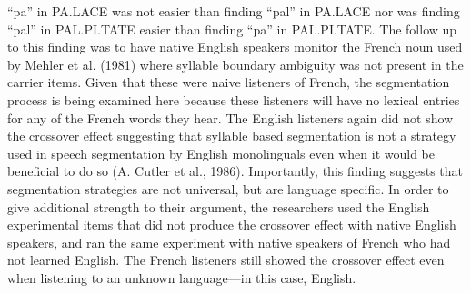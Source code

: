 “pa” in PA.LACE was not easier than finding “pal” in PA.LACE nor was finding “pal” in PAL.PI.TATE easier than finding “pa” in PAL.PI.TATE. The follow up to this finding was to have native English speakers monitor the French noun used by Mehler et al. (1981) where syllable boundary ambiguity was not present in the carrier items. Given that these were naive listeners of French, the segmentation process is being examined here because these listeners will have no lexical entries for any of the French words they hear. The English listeners again did not show the crossover effect suggesting that syllable based segmentation is not a strategy used in speech segmentation by English monolinguals even when it would be beneficial to do so (A. Cutler et al., 1986). Importantly, this finding suggests that segmentation strategies are not universal, but are language specific. In order to give additional strength to their argument, the researchers used the English experimental items that did not produce the crossover effect with native English speakers, and ran the same experiment with native speakers of French who had not learned English. The French listeners still showed the crossover effect even when listening to an unknown language—in this case, English. 
